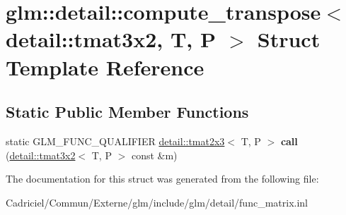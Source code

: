 \hypertarget{structglm_1_1detail_1_1compute__transpose_3_01detail_1_1tmat3x2_00_01_t_00_01_p_01_4}{}\section{glm\+:\+:detail\+:\+:compute\+\_\+transpose$<$ detail\+:\+:tmat3x2, T, P $>$ Struct Template Reference}
\label{structglm_1_1detail_1_1compute__transpose_3_01detail_1_1tmat3x2_00_01_t_00_01_p_01_4}
\subsection*{Static Public Member Functions}
\begin{DoxyCompactItemize}
\item 
static G\+L\+M\+\_\+\+F\+U\+N\+C\+\_\+\+Q\+U\+A\+L\+I\+F\+I\+ER \hyperlink{structglm_1_1detail_1_1tmat2x3}{detail\+::tmat2x3}$<$ T, P $>$ {\bfseries call} (\hyperlink{structglm_1_1detail_1_1tmat3x2}{detail\+::tmat3x2}$<$ T, P $>$ const \&m)\hypertarget{structglm_1_1detail_1_1compute__transpose_3_01detail_1_1tmat3x2_00_01_t_00_01_p_01_4_a0a30f21e987d479af32a28eb6aeb5def}{}\label{structglm_1_1detail_1_1compute__transpose_3_01detail_1_1tmat3x2_00_01_t_00_01_p_01_4_a0a30f21e987d479af32a28eb6aeb5def}

\end{DoxyCompactItemize}


The documentation for this struct was generated from the following file\+:\begin{DoxyCompactItemize}
\item 
Cadriciel/\+Commun/\+Externe/glm/include/glm/detail/func\+\_\+matrix.\+inl\end{DoxyCompactItemize}
